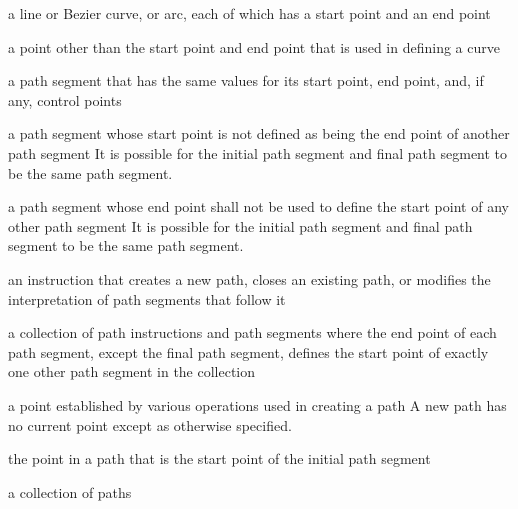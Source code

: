 
a line or Bezier curve, or arc, each of which has a start point and an end point

a point other than the start point and end point that is used in defining a curve

a path segment that has the same values for its start point, end point, and, if any, control points

a path segment whose start point is not defined as being the end point of another path segment
\enternote
It is possible for the initial path segment and final path segment to be the same path segment.
\exitnote

a path segment whose end point shall not be used to define the start point of any other path segment
\enternote
It is possible for the initial path segment and final path segment to be the same path segment.
\exitnote

an instruction that creates a new path, closes an existing path, or modifies the interpretation of path segments that follow it

a collection of path instructions and path segments where the end point of each path segment, except the final path segment, defines the start point of exactly one other path segment in the collection

a point established by various operations used in creating a path
\enternote
A new path has no current point except as otherwise specified.
\exitnote

the point in a path that is the start point of the initial path segment

a collection of paths

